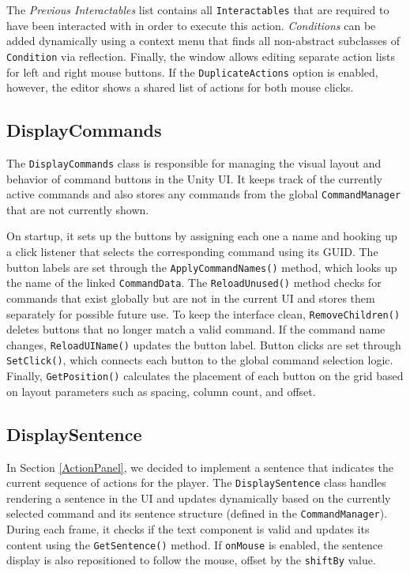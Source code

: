 The \textit{Previous Interactables} list contains all \verb|Interactables| that are required to have been interacted with in order to execute this action. \textit{Conditions} can be added dynamically using a context menu that finds all non-abstract subclasses of \verb|Condition| via reflection. Finally, the window allows editing separate action lists for left and right mouse buttons. If the \verb|DuplicateActions| option is enabled, however, the editor shows a shared list of actions for both mouse clicks. 

\subsection{DisplayCommands}
The \verb|DisplayCommands| class is responsible for managing the visual layout and behavior of command buttons in the Unity UI. It keeps track of the currently active commands and also stores any commands from the global \verb|CommandManager| that are not currently shown. 

On startup, it sets up the buttons by assigning each one a name and hooking up a click listener that selects the corresponding command using its GUID. The button labels are set through the \verb|ApplyCommandNames()| method, which looks up the name of the linked \verb|CommandData|. The \verb|ReloadUnused()| method checks for commands that exist globally but are not in the current UI and stores them separately for possible future use. To keep the interface clean, \verb|RemoveChildren()| deletes buttons that no longer match a valid command. If the command name changes, \verb|ReloadUIName()| updates the button label. Button clicks are set through \verb|SetClick()|, which connects each button to the global command selection logic. Finally, \verb|GetPosition()| calculates the placement of each button on the grid based on layout parameters such as spacing, column count, and offset.

 \subsection{DisplaySentence}
In Section \ref{ActionPanel}, we decided to implement a sentence that indicates the current sequence of actions for the player. The \verb|DisplaySentence| class handles rendering a sentence in the UI and updates dynamically based on the currently selected command and its sentence structure (defined in the \verb|CommandManager|). During each frame, it checks if the text component is valid and updates its content using the \verb|GetSentence()| method. If \verb|onMouse| is enabled, the sentence display is also repositioned to follow the mouse, offset by the \verb|shiftBy| value.

